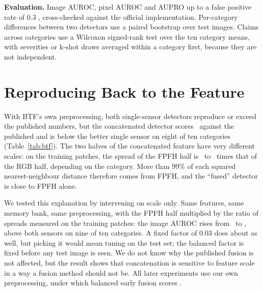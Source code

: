 \documentclass[10pt,twocolumn,letterpaper]{article}
\begin{document}
\textbf{Evaluation.} Image AUROC, pixel AUROC and AUPRO up to a false positive rate of 0.3 \citep{bergmann2021mvtecad}, cross-checked against the official implementation. Per-category differences between two detectors use a paired bootstrap over test images. Claims across categories use a Wilcoxon signed-rank test over the ten category means, with severities or k-shot draws averaged within a category first, because they are not independent.

\section{Reproducing Back to the Feature}
\label{sec:btf}

\begin{table}[t]
\centering\small

\caption{Image AUROC, mean of ten categories, with BTF's preprocessing. The single-sensor halves reproduce; the concatenation does not. Scaling the FPFH half so both halves have equal spread on the training patches lifts the same detector above both sensors.}
\label{tab:btf}
\end{table}

With BTF's own preprocessing, both single-sensor detectors reproduce or exceed the published numbers, but the concatenated detector scores \btfConcat\ against the published \btfPaper and is below the better single sensor on eight of ten categories (Table~\ref{tab:btf}). The two halves of the concatenated feature have very different scales: on the training patches, the spread of the FPFH half is \spreadMin\ to \spreadMax\ times that of the RGB half, depending on the category. More than 99\% of each squared nearest-neighbour distance therefore comes from FPFH, and the ``fused'' detector is close to FPFH alone.

We tested this explanation by intervening on scale only. Same features, same memory bank, same preprocessing, with the FPFH half multiplied by the ratio of spreads measured on the training patches: the image AUROC rises from \btfConcat\ to \btfBalanced, above both sensors on nine of ten categories. A fixed factor of 0.03 does about as well, but picking it would mean tuning on the test set; the balanced factor is fixed before any test image is seen. We do not know why the published fusion is not affected, but the result shows that concatenation is sensitive to feature scale in a way a fusion method should not be. All later experiments use our own preprocessing, under which balanced early fusion scores \earlyOurs.
\end{document}
